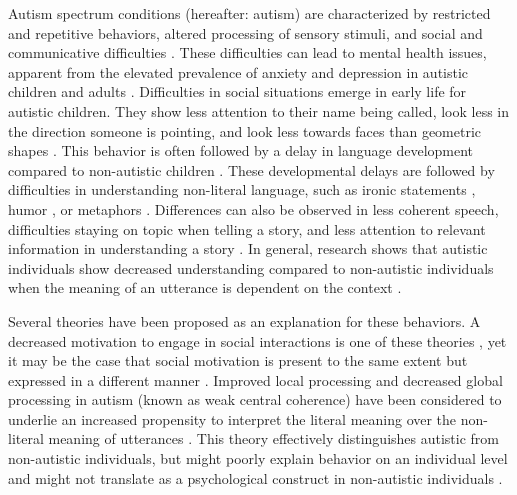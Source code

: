 Autism spectrum conditions (hereafter: autism) are characterized by restricted and repetitive behaviors, altered processing of sensory stimuli, and social and communicative difficulties \citep{apa2013}. These difficulties can lead to mental health issues, apparent from the elevated prevalence of anxiety and depression in autistic children and adults \citep{hollocks2019,lai2019,vasa2020}. Difficulties in social situations emerge in early life for autistic children. They show less attention to their name being called, look less in the direction someone is pointing, and look less towards faces than geometric shapes \citep{goldberg2005,osterling2002,pierce2011}. This behavior is often followed by a delay in language development compared to non-autistic children \citep{kim2014}. These developmental delays are followed by difficulties in understanding non-literal language, such as ironic statements \citep{wang2006,deliens2018}, humor \citep{ozonoff1996}, or metaphors \citep{rundblad2010}. Differences can also be observed in less coherent speech, difficulties staying on topic when telling a story, and less attention to relevant information in understanding a story \citep{diehl2006,volden2002,yingsng2018}. In general, research shows that autistic individuals show decreased understanding compared to non-autistic individuals when the meaning of an utterance is dependent on the context \citep{angeleri2016,happe1997,loukusa2007,wadge2019}. 

Several theories have been proposed as an explanation for these behaviors. A decreased motivation to engage in social interactions is one of these theories \citep{chevallier2012}, yet it may be the case that social motivation is present to the same extent but expressed in a different manner \citep{escalona2002}. Improved local processing and decreased global processing in autism (known as weak central coherence) have been considered to underlie an increased propensity to interpret the literal meaning over the non-literal meaning of utterances \citep{happe1997}. This theory effectively distinguishes autistic from non-autistic individuals, but might poorly explain behavior on an individual level \citep{pellicano2006} and might not translate as a psychological construct in non-autistic individuals \citep{pellicano2005}. 

